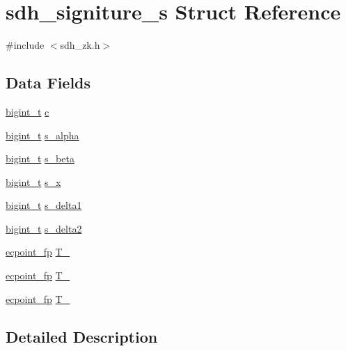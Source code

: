 \hypertarget{structsdh__signiture__s}{\section{sdh\-\_\-signiture\-\_\-s Struct Reference}
\label{structsdh__signiture__s}
}


{\ttfamily \#include $<$sdh\-\_\-zk.\-h$>$}

\subsection*{Data Fields}
\begin{DoxyCompactItemize}
\item 
\hyperlink{types_8h_a7ae8816fa287bc4a98dec462acd2ad28}{bigint\-\_\-t} \hyperlink{structsdh__signiture__s_a4157eba2c6a864442f4e9aca77d86789}{c}
\item 
\hyperlink{types_8h_a7ae8816fa287bc4a98dec462acd2ad28}{bigint\-\_\-t} \hyperlink{structsdh__signiture__s_af9205d46759214e39aae7e340bedd990}{s\-\_\-alpha}
\item 
\hyperlink{types_8h_a7ae8816fa287bc4a98dec462acd2ad28}{bigint\-\_\-t} \hyperlink{structsdh__signiture__s_a113226e9c2a5ef9308e5763705816b6b}{s\-\_\-beta}
\item 
\hyperlink{types_8h_a7ae8816fa287bc4a98dec462acd2ad28}{bigint\-\_\-t} \hyperlink{structsdh__signiture__s_a5f0af1c84479728b17ac0cab39f6e587}{s\-\_\-x}
\item 
\hyperlink{types_8h_a7ae8816fa287bc4a98dec462acd2ad28}{bigint\-\_\-t} \hyperlink{structsdh__signiture__s_a99bc3d658582a834173aa97a9a5989ba}{s\-\_\-delta1}
\item 
\hyperlink{types_8h_a7ae8816fa287bc4a98dec462acd2ad28}{bigint\-\_\-t} \hyperlink{structsdh__signiture__s_aee44aef0906dddc0a503ca02896a1e3a}{s\-\_\-delta2}
\item 
\hyperlink{structecpoint__fp}{ecpoint\-\_\-fp} \hyperlink{structsdh__signiture__s_aef45e7434100d23b8524adc8ff9029ac}{T\-\_}
\item 
\hyperlink{structecpoint__fp}{ecpoint\-\_\-fp} \hyperlink{structsdh__signiture__s_aa65d15c0c542386b6cca20c860925bb7}{T\-\_}
\item 
\hyperlink{structecpoint__fp}{ecpoint\-\_\-fp} \hyperlink{structsdh__signiture__s_a7603580595713865bcb5d995d491bb86}{T\-\_}
\end{DoxyCompactItemize}


\subsection{Detailed Description}


